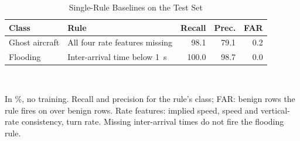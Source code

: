 \begin{table}[t]
\centering
\footnotesize
\caption{Single-Rule Baselines on the Test Set}
\label{tab:rules}
\setlength{\tabcolsep}{3pt}
\begin{tabularx}{\columnwidth}{@{}l>{\raggedright\arraybackslash}Xrrr@{}}
\toprule
Class & Rule & Recall & Prec. & FAR \\
\midrule
Ghost aircraft & All four rate features missing & 98.1 & 79.1 & 0.2 \\
Flooding & Inter-arrival time below 1~s & 100.0 & 98.7 & 0.0 \\
\bottomrule
\end{tabularx}
\\[2pt]
\parbox{\linewidth}{\scriptsize In \%, no training. Recall and precision for the rule's class; FAR: benign rows the rule fires on over benign rows. Rate features: implied speed, speed and vertical-rate consistency, turn rate. Missing inter-arrival times do not fire the flooding rule.}
\end{table}
